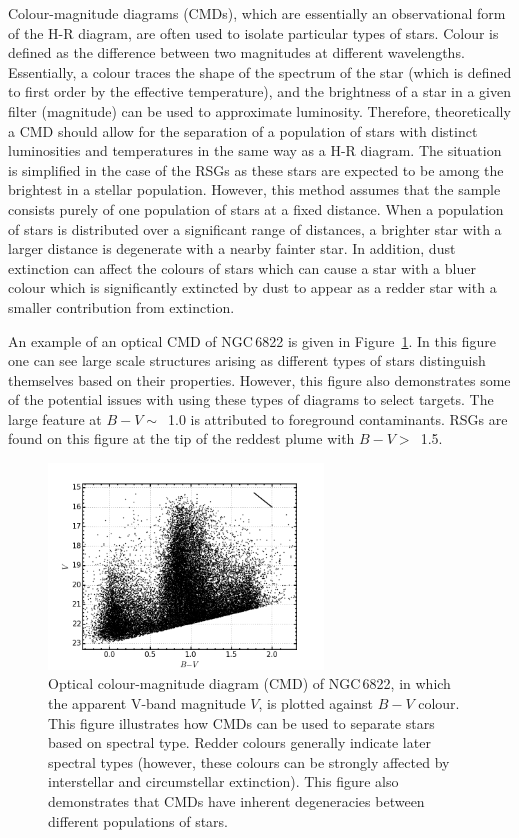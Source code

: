 Colour-magnitude diagrams (CMDs), which are essentially an observational form of the H-R diagram, are often used to isolate particular types of stars.
Colour is defined as the difference between two magnitudes at different wavelengths.
Essentially, a colour traces the shape of the spectrum of the star (which is defined to first order by the effective temperature), and the brightness of a star in a given filter (magnitude) can be used to approximate luminosity.
Therefore, theoretically a CMD should allow for the separation of a population of stars with distinct luminosities and temperatures in the same way as a H-R diagram.
The situation is simplified in the case of the RSGs as these stars are expected to be among the brightest in a stellar population.
However, this method assumes that the sample consists purely of one population of stars at a fixed distance.
When a population of stars is distributed over a significant range of distances, a brighter star with a larger distance is degenerate with a nearby fainter star.
In addition, dust extinction can affect the colours of stars which can cause a star with a bluer colour which is significantly extincted by dust to appear as a redder star with a smaller contribution from extinction.

An example of an optical CMD of NGC\,6822 is given in Figure~\ref{fig:CMD}.
In this figure one can see large scale structures arising as different types of stars distinguish themselves based on their properties.
However, this figure also demonstrates some of the potential issues with using these types of diagrams to select targets.
The large feature at $B-V \sim$~1.0 is attributed to foreground contaminants.
RSGs are found on this figure at the tip of the reddest plume with $B-V >$~1.5.

\begin{figure}
 \centering
 \includegraphics[width=0.65\textwidth]{intro/NGC6822_bv_CMD}
 \caption[Optical colour-magnitude diagram of NGC\,6822]{Optical colour-magnitude diagram (CMD) of NGC\,6822, in which the apparent V-band magnitude $V$, is plotted against $B-V$ colour.
This figure illustrates how CMDs can be used to separate stars based on spectral type. Redder colours generally indicate later spectral types (however, these colours can be strongly affected by interstellar and circumstellar extinction).
This figure also demonstrates that CMDs have inherent degeneracies between different populations of stars.
 \label{fig:CMD}}
\end{figure}

